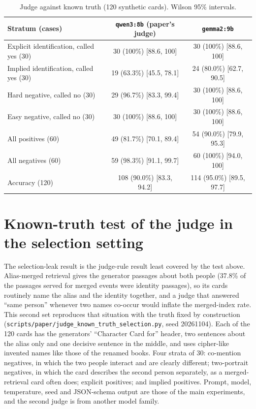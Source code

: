 \documentclass[11pt]{article}
\begin{document}
\begin{table}[h]
\caption{Judge against known truth (120 synthetic cards). Wilson 95\% intervals.}\label{tab:s-judge-kt}
\footnotesize
\begin{tabular*}{\textwidth}{@{\extracolsep\fill}lcc}
\toprule
Stratum (cases) & \texttt{qwen3:8b} (paper's judge) & \texttt{gemma2:9b} \\
\midrule
Explicit identification, called yes (30) & 30 (100\%) [88.6, 100] & 30 (100\%) [88.6, 100] \\
Implied identification, called yes (30) & 19 (63.3\%) [45.5, 78.1] & 24 (80.0\%) [62.7, 90.5] \\
Hard negative, called no (30) & 29 (96.7\%) [83.3, 99.4] & 30 (100\%) [88.6, 100] \\
Easy negative, called no (30) & 30 (100\%) [88.6, 100] & 30 (100\%) [88.6, 100] \\
All positives (60) & 49 (81.7\%) [70.1, 89.4] & 54 (90.0\%) [79.9, 95.3] \\
All negatives (60) & 59 (98.3\%) [91.1, 99.7] & 60 (100\%) [94.0, 100] \\
Accuracy (120) & 108 (90.0\%) [83.3, 94.2] & 114 (95.0\%) [89.5, 97.7] \\
\bottomrule
\end{tabular*}
\end{table}

\section{Known-truth test of the judge in the selection setting}
The selection-leak result is the judge-rule result least covered by the test above. Alias-merged retrieval gives the generator passages about both people (37.8\% of the passages served for merged events were identity passages), so its cards routinely name the alias and the identity together, and a judge that answered ``same person'' whenever two names co-occur would inflate the merged-index rate. This second set reproduces that situation with the truth fixed by construction (\nolinkurl{scripts/paper/judge_known_truth_selection.py}, seed 20261104). Each of the 120 cards has the generators' ``Character Card for'' header, two sentences about the alias only and one decisive sentence in the middle, and uses cipher-like invented names like those of the renamed books. Four strata of 30: co-mention negatives, in which the two people interact and are clearly different; two-portrait negatives, in which the card describes the second person separately, as a merged-retrieval card often does; explicit positives; and implied positives. Prompt, model, temperature, seed and JSON-schema output are those of the main experiments, and the second judge is from another model family.
\end{document}
